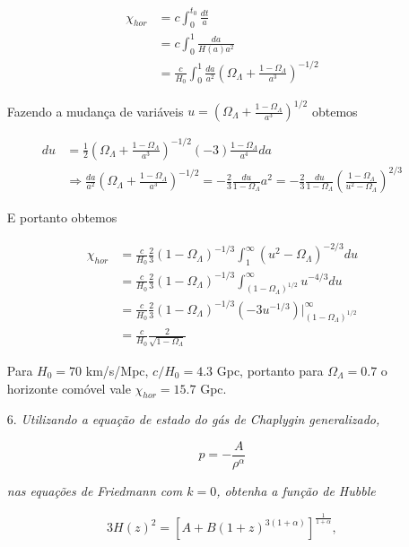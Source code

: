 \documentclass[a4paper, 12pt, notitlepage]{article}
\begin{document}
\begin{enumerate}
\begin{align*}
  \chi_{hor} &= c \int_0^{t_0} \frac{dt}{a} \\
  &= c \int_0^1 \frac{da}{H(a) a^2} \\
  &= \frac{c}{H_0} \int_0^1 \frac{da}{a^2}\left(\Omega_\Lambda  +\frac{1 - \Omega_\Lambda}{a^3}\right)^{-1/2}
\end{align*}

Fazendo a mudança de variáveis $u = \left(\Omega_\Lambda + \frac{1 - \Omega_\Lambda}{a^3}\right)^{1/2}$ obtemos

\begin{align*}
  du &= \frac{1}{2}\left(\Omega_\Lambda + \frac{1 - \Omega_\Lambda}{a^3}\right)^{-1/2}(-3)\frac{1 - \Omega_\Lambda}{a^4} da \\
  &\Rightarrow \frac{da}{a^2} \left(\Omega_\Lambda + \frac{1 - \Omega_\Lambda}{a^3}\right)^{-1/2} = -\frac{2}{3} \frac{du}{1 - \Omega_\Lambda} a^2 = -\frac{2}{3} \frac{du}{1 - \Omega_\Lambda} \left(\frac{1 - \Omega_\Lambda}{u^2 - \Omega_\Lambda}\right)^{2/3}
\end{align*}

E portanto obtemos

\begin{align*}
  \chi_{hor} &= \frac{c}{H_0} \frac{2}{3} (1-\Omega_\Lambda)^{-1/3} \int_1^{\infty} (u^2 - \Omega_\Lambda)^{-2/3} du \\
  &= \frac{c}{H_0} \frac{2}{3} (1-\Omega_\Lambda)^{-1/3} \int_{(1 - \Omega_\Lambda)^{1/2}}^{\infty} u^{-4/3} du \\
  &= \frac{c}{H_0} \frac{2}{3} (1-\Omega_\Lambda)^{-1/3} (-3u^{-1/3})\Big|_{(1 - \Omega_\Lambda)^{1/2}}^{\infty} \\
  &= \frac{c}{H_0} \frac{2}{\sqrt{1-\Omega_\Lambda}}  
\end{align*}

Para $H_0 = 70$ km/s/Mpc, $c/H_0 = 4.3$ Gpc, portanto para $\Omega_\Lambda = 0.7$ o horizonte comóvel vale $\chi_{hor} = 15.7$ Gpc.

\pagebreak

\item[6. ]\textit{Utilizando a equação de estado do gás de Chaplygin generalizado,}

\begin{equation}
  p = -\frac{A}{\rho^{\alpha}}
\end{equation}

\noindent \textit{nas equações de Friedmann com $k = 0$, obtenha a função de Hubble}

\begin{equation}
  3H(z)^2 = \left[A + B(1 + z)^{3(1+\alpha)}\right]^{\frac{1}{1  +\alpha}},
\end{equation}


\end{enumerate}
\end{document}
